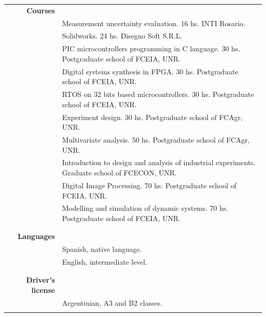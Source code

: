 \documentclass[a4paper,10pt, sans]{article}
\begin{document}
\begin{table}[H]
\begin{tabularx}{\textwidth}{r X}
    \textbf{Courses} & {}\\ [1ex]
    {} & Measurement uncertainty evaluation. 16 hs. INTI Rosario. \\  [1ex]
    {} & Solidworks. 24 hs. Disegno Soft S.R.L. \\  [1ex]
    {} & PIC microcontrollers programming in C language. 30 hs. Postgraduate school of FCEIA, UNR. \\  [1ex]
    {} & Digital systems synthesis in FPGA. 30 hs. Postgraduate school of FCEIA, UNR. \\  [1ex]
    {} & RTOS on 32 bits based microcontrollers. 30 hs. Postgraduate school of FCEIA, UNR. \\  [1ex]
    {} & Experiment design. 30 hs. Postgraduate school of FCAgr, UNR. \\  [1ex]
    {} & Multivariate analysis. 50 hs. Postgraduate school of FCAgr, UNR. \\  [1ex]
    {} & Introduction to design and analysis of industrial experiments. Graduate school of FCECON, UNR. \\  [1ex]
    {} & Digital Image Processing. 70 hs. Postgraduate school of FCEIA, UNR. \\  [1ex]
    {} & Modelling and simulation of dynamic systems. 70 hs. Postgraduate school of FCEIA, UNR. \\ \\ \hline \\
      
    \textbf{Languages} & {} \\ [1ex]
    {} & Spanish, native language. \\ [1ex]
    {} & English, intermediate level. \\ \\ \hline \\
      
    \textbf{Driver's license} & {} \\ [1ex]
    {} & Argentinian, A3 and B2 classes.\\
    
\vspace{5cm}
    
    
    
    
        
  \end{tabularx}
  \end{table}
  
\end{document}
